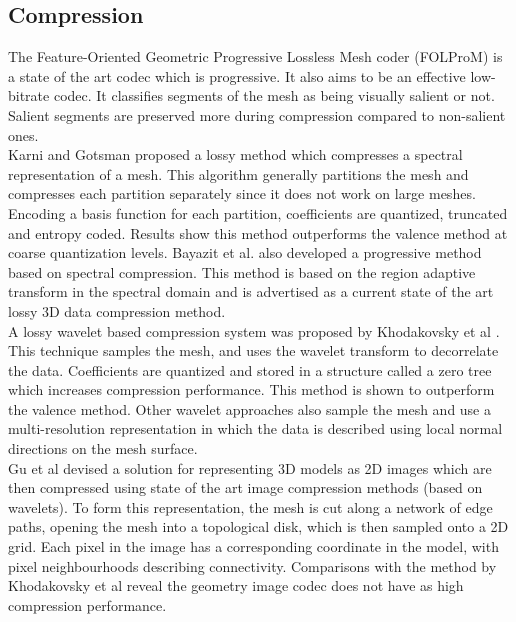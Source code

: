 \subsection{Compression}

The Feature-Oriented Geometric Progressive Lossless Mesh coder (FOLProM) \cite{Peng10Feature} is a state of the art codec which is progressive. It also aims to be an effective low-bitrate codec. It classifies segments of the mesh as being visually salient or not. Salient segments are preserved more during compression compared to non-salient ones. \\

Karni and Gotsman \cite{Karni00Spectral} proposed a lossy method which compresses a spectral representation of a mesh. This algorithm generally partitions the mesh and compresses each partition separately since it does not work on large meshes. Encoding a basis function for each partition, coefficients are quantized, truncated and entropy coded. Results show this method outperforms the valence method \cite{touma98triangle} at coarse quantization levels. Bayazit et al. \cite{Bayazit103DMesh} also developed a progressive method based on spectral compression. This method is based on the region adaptive transform in the spectral domain and is advertised as a current state of the art lossy 3D data compression method. \\

A lossy wavelet based compression system was proposed by Khodakovsky et al \cite{Khodakovsky00Progressive}. This technique samples the mesh, and uses the wavelet transform to decorrelate the data. Coefficients are quantized and stored in a structure called a zero tree which increases compression performance. This method is shown to outperform the valence method. Other wavelet approaches \cite{Guskov00Normal,Khodakovsky04Normalmesh} also sample the mesh and use a multi-resolution representation in which the data is described using local normal directions on the mesh surface. \\

Gu et al \cite{Gu02Geometry} devised a solution for representing 3D models as 2D images which are then compressed using state of the art image compression methods (based on wavelets). To form this representation, the mesh is cut along a network of edge paths, opening the mesh into a topological disk, which is then sampled onto a 2D grid. Each pixel in the image has a corresponding coordinate in the model, with pixel neighbourhoods describing connectivity. Comparisons with the method by Khodakovsky et al reveal the geometry image codec does not have as high compression performance.


